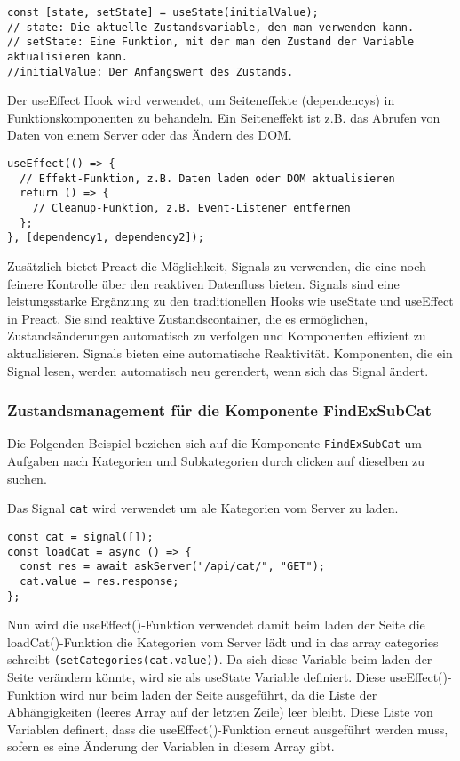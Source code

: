 \begin{lstlisting}
const [state, setState] = useState(initialValue);
// state: Die aktuelle Zustandsvariable, den man verwenden kann.
// setState: Eine Funktion, mit der man den Zustand der Variable aktualisieren kann.
//initialValue: Der Anfangswert des Zustands.

\end{lstlisting}


Der useEffect Hook wird verwendet, um Seiteneffekte (dependencys) in Funktionskomponenten zu behandeln. Ein Seiteneffekt ist z.B. das Abrufen von Daten von einem Server oder das Ändern des DOM.

\begin{lstlisting}
useEffect(() => {
  // Effekt-Funktion, z.B. Daten laden oder DOM aktualisieren
  return () => {
    // Cleanup-Funktion, z.B. Event-Listener entfernen
  };
}, [dependency1, dependency2]);

\end{lstlisting}
  


Zusätzlich bietet Preact die Möglichkeit, Signals zu verwenden, die eine noch feinere Kontrolle über den reaktiven Datenfluss bieten.
Signals sind eine leistungsstarke Ergänzung zu den traditionellen Hooks wie useState und useEffect in Preact. Sie sind reaktive Zustandscontainer, die es ermöglichen, Zustandsänderungen automatisch zu verfolgen und Komponenten effizient zu aktualisieren. Signals bieten eine automatische Reaktivität. Komponenten, die ein Signal lesen, werden automatisch neu gerendert, wenn sich das Signal ändert.


\subsubsection{Zustandsmanagement für die Komponente FindExSubCat } 
Die Folgenden Beispiel beziehen sich auf die Komponente \texttt{FindExSubCat} um Aufgaben nach Kategorien und Subkategorien durch clicken auf dieselben zu suchen.

Das Signal \texttt{cat} wird verwendet um ale Kategorien vom Server zu laden.

\begin{lstlisting}
const cat = signal([]);
const loadCat = async () => {
  const res = await askServer("/api/cat/", "GET");
  cat.value = res.response;
};

\end{lstlisting}

Nun wird die useEffect()-Funktion verwendet damit beim laden der Seite die loadCat()-Funktion die Kategorien vom Server lädt und in das array categories schreibt \texttt{(setCategories(cat.value))}. Da sich diese Variable beim laden der Seite verändern könnte, wird sie als useState Variable definiert. 
Diese useEffect()-Funktion wird nur beim laden der Seite ausgeführt, da die Liste der Abhängigkeiten (leeres Array auf der letzten Zeile) leer bleibt. Diese Liste von Variablen definert, dass die useEffect()-Funktion erneut ausgeführt werden muss, sofern es eine Änderung der Variablen in diesem Array gibt.

